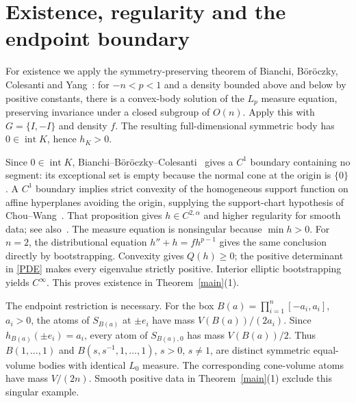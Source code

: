 \documentclass[11pt]{article}
\newcommand{\Q}{Q}
\begin{document}
\section{Existence, regularity and the endpoint boundary}

For existence we apply the symmetry-preserving theorem of Bianchi, B\"or\"oczky, Colesanti and Yang~\cite[Theorem 1.7 and Proposition 7.3]{BBCY}: for $-n<p<1$ and a density bounded above and below by positive constants, there is a convex-body solution of the $L_p$ measure equation, preserving invariance under a closed subgroup of $O(n)$. Apply this with $G=\{I,-I\}$ and density $f$. The resulting full-dimensional symmetric body has $0\in\operatorname{int}K$, hence $h_K>0$.

Since $0\in\operatorname{int}K$, Bianchi--B\"or\"oczky--Colesanti~\cite[Theorem 1.1(i)]{BBC} gives a $C^1$ boundary containing no segment: its exceptional set is empty because the normal cone at the origin is $\{0\}$. A $C^1$ boundary implies strict convexity of the homogeneous support function on affine hyperplanes avoiding the origin, supplying the support-chart hypothesis of Chou--Wang~\cite[Proposition 1.2]{CW}. That proposition gives $h\in C^{2,\alpha}$ and higher regularity for smooth data; see also~\cite[Theorem 1.1(iv)]{BBC}. The measure equation is nonsingular because $\min h>0$. For $n=2$, the distributional equation $h''+h=fh^{p-1}$ gives the same conclusion directly by bootstrapping. Convexity gives $\Q(h)\ge0$; the positive determinant in \eqref{PDE} makes every eigenvalue strictly positive. Interior elliptic bootstrapping yields $C^\infty$. This proves existence in Theorem~\ref{main}(1).

The endpoint restriction is necessary. For the box $B(a)=\prod_{i=1}^n[-a_i,a_i]$, $a_i>0$, the atoms of $S_{B(a)}$ at $\pm e_i$ have mass $V(B(a))/(2a_i)$. Since $h_{B(a)}(\pm e_i)=a_i$, every atom of $S_{B(a),0}$ has mass $V(B(a))/2$. Thus $B(1,\ldots,1)$ and $B(s,s^{-1},1,\ldots,1)$, $s>0$, $s\ne1$, are distinct symmetric equal-volume bodies with identical $L_0$ measure. The corresponding cone-volume atoms have mass $V/(2n)$. Smooth positive data in Theorem~\ref{main}(1) exclude this singular example.
\end{document}
